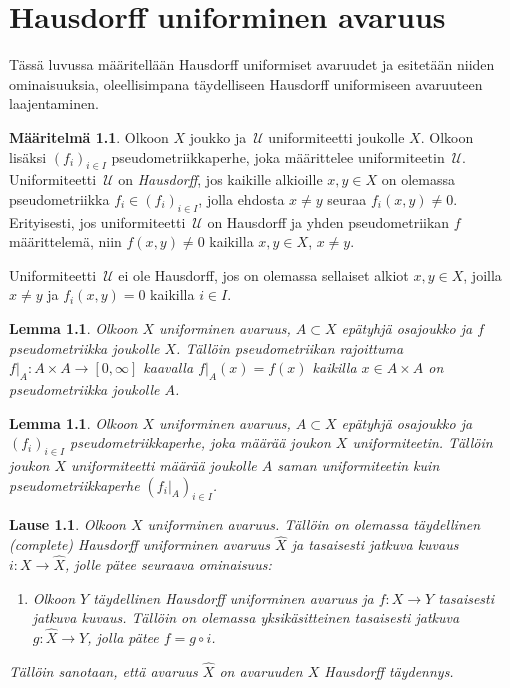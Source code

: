 \documentclass[12pt,a4paper,leqno]{report}
\newcommand{\U}{\,\mathcal{U}}
\theoremstyle{plain}
\newtheorem{lause}[equation]{Lause}
\newtheorem{lem}[equation]{Lemma}
\theoremstyle{definition}
\newtheorem{maar}[equation]{Määritelmä}
\theoremstyle{remark}
\begin{document}
\chapter{Hausdorff uniforminen avaruus}
Tässä luvussa määritellään Hausdorff uniformiset avaruudet ja 
esitetään niiden ominaisuuksia, 
oleellisimpana täydelliseen Hausdorff uniformiseen avaruuteen laajentaminen.
\begin{maar}
Olkoon $X$ joukko ja $\U$ uniformiteetti joukolle $X$. 
Olkoon lisäksi $(f_i)_{i\in I}$ pseudometriikkaperhe, joka määrittelee uniformiteetin $\U$. 
Uniformiteetti $\U$ on \emph{Hausdorff}, jos kaikille alkioille $x,y\in X$ on 
olemassa pseudometriikka $f_i\in(f_i)_{i\in I}$, 
jolla ehdosta $x\neq y$ seuraa $f_i(x,y)\neq 0$. 
Erityisesti, jos uniformiteetti $\U$ on Hausdorff 
ja yhden pseudometriikan $f$ määrittelemä, 
niin $f(x,y)\neq 0$ kaikilla $x,y\in X$, $x\neq y$.

Uniformiteetti $\U$ ei ole Hausdorff, jos on olemassa sellaiset alkiot $x,y\in X$, joilla $x\neq y$ ja $f_i(x,y)=0$ kaikilla $i\in I$.
\end{maar}
\begin{lem}
Olkoon $X$ uniforminen avaruus, $A\subset X$ epätyhjä osajoukko 
ja $f$ pseudometriikka joukolle $X$. 
Tällöin pseudometriikan rajoittuma 
$f|_A\colon A\times A\rightarrow [0,\infty]$ kaavalla $ f|_A(x)=f(x)$ 
kaikilla $x\in A\times A$ 
on pseudometriikka joukolle $A$. 
\end{lem}
\begin{lem}
Olkoon $X$ uniforminen avaruus, $A\subset X$ epätyhjä osajoukko 
ja $(f_i)_{i\in I}$ pseudometriikkaperhe, 
joka määrää joukon $X$ uniformiteetin. 
Tällöin joukon $X$ uniformiteetti määrää joukolle $A$ saman uniformiteetin 
kuin pseudometriikkaperhe $(f_i|_A)_{i\in I}$.
\end{lem}
\begin{lause}\label{complete}
Olkoon $X$ uniforminen avaruus. 
Tällöin on olemassa täydellinen (com\-plete) Hausdorff 
uniforminen avaruus $\hat X$ ja tasaisesti jatkuva 
kuvaus $i\colon X\rightarrow\hat X$, jolle pätee seuraava ominaisuus:
\begin{enumerate} [label=(P),ref=(P)]
\item %
\label{ominaisuusP}
Olkoon $Y$ täydellinen Hausdorff uniforminen avaruus 
ja $f\colon X\rightarrow Y$ tasaisesti jatkuva kuvaus. 
Tällöin on olemassa yksikäsitteinen tasaisesti 
jatkuva $g\colon \hat X\rightarrow Y$, 
jolla pätee $f=g\circ i$.
\end{enumerate}
Tällöin sanotaan, että avaruus $\hat X$ on avaruuden $X$ Hausdorff täydennys.
\end{lause}
\end{document}
